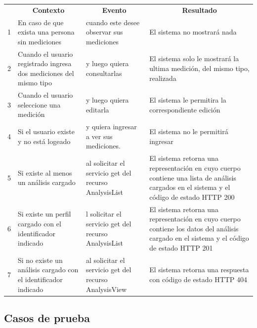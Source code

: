 \begin{center}
\begin{longtable}{|p{0.7cm}|p{4cm}|p{4cm}|p{5cm}| }

	\hline 
		\rowcolor[gray]{0.9} 
		\multicolumn{4}{|c|}{\textbf{Criterio de aceptación}} \\
	\hline
    	\rowcolor[gray]{0.9} 
    	\multicolumn{1}{|c}{\textbf{Id}} & \multicolumn{1}{|c}{\textbf{Contexto}} &  \multicolumn{1}{|c}{\textbf{Evento}} & \multicolumn{1}{|c|}{\textbf{Resultado}} \\
    \hline
    	
1&En caso de que exista una persona sin mediciones & cuando este desee observar sus mediciones  & El sistema no mostrará nada \\ \hline
 
2& Cuando el usuario registrado ingresa dos mediciones del mismo tipo  & y luego quiera consultarlas & El sistema solo le mostrará la ultima medición, del mismo tipo, realizada\\ \hline

3& Cuando el usuario seleccione una medición & y luego quiera editarla & El sistema le permitira la correspondiente edición\\ \hline

4& Si el usuario existe y no está logeado & y quiera ingresar a ver sus mediciones. & El sistema no le permitirá ingresar\\ \hline

5& Si existe al menos un análisis cargado & al solicitar el servicio get del recurso AnalysisList & El sistema retorna una representación en cuyo cuerpo contiene una lista de análisis cargados en el sistema y el código de estado HTTP 200\\ \hline

6& Si existe un perfil cargado con el identificador indicado & l solicitar el servicio get del recurso AnalysisList & El sistema retorna una representación en cuyo cuerpo contiene los datos del análisis cargado en el sistema y el código de estado HTTP 201\\ \hline

7& Si no existe un análisis cargado con el identificador indicado & al solicitar el servicio get del recurso AnalysisView & El sistema retorna una respuesta con código de estado HTTP 404\\ \hline
  \end{longtable}
\end{center}


\subsection{Casos de prueba}


